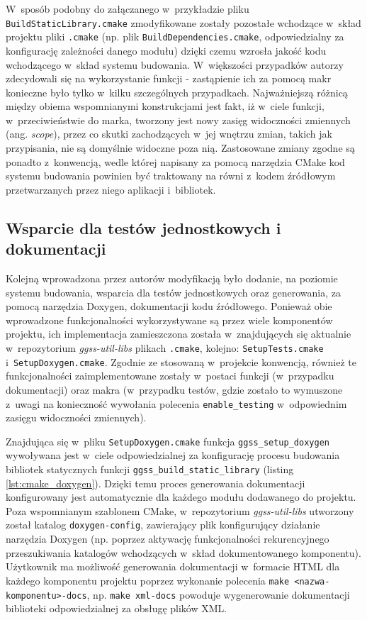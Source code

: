 W~sposób podobny do załączanego w~przykładzie pliku \lstinline{BuildStaticLibrary.cmake} zmodyfikowane zostały pozostałe wchodzące w~skład projektu pliki \lstinline{.cmake} (np. plik \lstinline{BuildDependencies.cmake}, odpowiedzialny za konfigurację zależności danego modułu) dzięki czemu wzrosła jakość kodu wchodzącego w~skład systemu budowania. W~większości przypadków autorzy zdecydowali się na wykorzystanie funkcji - zastąpienie ich za pomocą makr konieczne było tylko w~kilku szczególnych przypadkach. Najważniejszą różnicą między obiema wspomnianymi konstrukcjami jest fakt, iż w~ciele funkcji, w~przeciwieństwie do marka, tworzony jest nowy zasięg widoczności zmiennych (ang. \emph{scope}), przez co skutki zachodzących w~jej wnętrzu zmian, takich jak przypisania, nie są domyślnie widoczne poza nią. Zastosowane zmiany zgodne są ponadto z~konwencją, wedle której napisany za pomocą narzędzia CMake kod systemu budowania powinien być traktowany na równi z~kodem źródłowym przetwarzanych przez niego aplikacji i~bibliotek. 

\subsection{Wsparcie dla testów jednostkowych i dokumentacji}
Kolejną wprowadzona przez autorów modyfikacją było dodanie, na poziomie systemu budowania, wsparcia dla testów jednostkowych oraz generowania, za pomocą narzędzia Doxygen, dokumentacji kodu źródłowego. Ponieważ obie wprowadzone funkcjonalności wykorzystywane są przez wiele komponentów projektu, ich implementacja zamieszczona została w~znajdujących się aktualnie w~repozytorium \emph{ggss-util-libs} plikach \lstinline{.cmake}, kolejno: \lstinline{SetupTests.cmake} i~\lstinline{SetupDoxygen.cmake}. Zgodnie ze stosowaną w~projekcie konwencją, również te funkcjonalności zaimplementowane zostały w~postaci funkcji (w~przypadku dokumentacji) oraz makra (w~przypadku testów, gdzie zostało to wymuszone z~uwagi na konieczność wywołania polecenia \lstinline{enable_testing} w~odpowiednim zasięgu widoczności zmiennych). 


Znajdująca się w~pliku \lstinline{SetupDoxygen.cmake} funkcja \lstinline{ggss_setup_doxygen} wywoływana jest w~ciele odpowiedzialnej za konfigurację procesu budowania bibliotek statycznych funkcji \lstinline{ggss_build_static_library} (listing \ref{lst:cmake_doxygen}). Dzięki temu proces generowania dokumentacji konfigurowany jest automatycznie dla każdego modułu dodawanego do projektu. Poza wspomnianym szablonem CMake, w~repozytorium \emph{ggss-util-libs} utworzony został katalog \lstinline{doxygen-config}, zawierający plik konfigurujący działanie narzędzia Doxygen (np. poprzez aktywację funkcjonalności rekurencyjnego przeszukiwania katalogów wchodzących w~skład dokumentowanego komponentu). Użytkownik ma możliwość generowania dokumentacji w~formacie HTML dla każdego komponentu projektu poprzez wykonanie polecenia \lstinline{make <nazwa-komponentu>-docs}, np. \lstinline{make xml-docs} powoduje wygenerowanie dokumentacji biblioteki odpowiedzialnej za obsługę plików XML.

